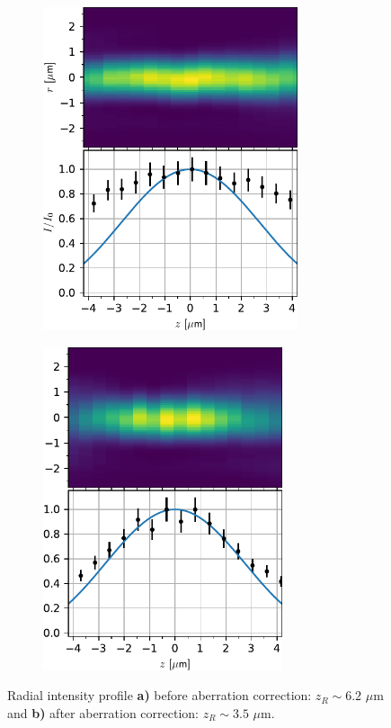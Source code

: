 \begin{figure}
\centering
	\begin{subfigure}{.49\textwidth}
	    \centering
		\includegraphics[height=9.5cm]{figures/AxialImageTweezerScanUncorrected.pdf}
		\caption{}
		\label{fig:AxialUncorrected}
	\end{subfigure}
	\begin{subfigure}{.49\textwidth}
		\centering
		\includegraphics[height=9.5cm]{figures/AxialImageTweezerScan.pdf}
		\caption{}
		\label{fig:AxialZernike}
	\end{subfigure}
	\caption{Radial intensity profile \textbf{a)} before aberration correction: $z_R \sim 6.2$ $\mu$m and \textbf{b)} after aberration correction: $z_R \sim 3.5$ $\mu$m.}
	\label{fig:AxialScans}
\end{figure}


